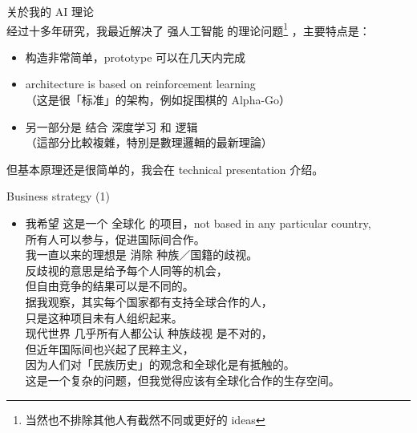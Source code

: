 \documentclass[10pt]{beamer}
\newcommand{\emp}[1]{{\color{blue}#1}}
\newcommand{\smiley}{$\vcenter{\hbox{\texttt{[image: ../smiling-face.png]}}}$}
\begin{document}



\begin{frame}
\vspace*{2em}
{\color{blue} \Large 关於我的 AI 理论}\\
\vspace*{1em}
经过十多年研究，我最近解决了 强人工智能 的理论问题\footnote{当然也不排除其他人有截然不同或更好的 ideas} ，主要特点是：
\begin{itemize}
	\item 构造非常简单，prototype 可以在几天内完成
	\item architecture is based on \emp{reinforcement learning} \\
	（这是很「标准」的架构，例如捉围棋的 Alpha-Go）
	\item 另一部分是 结合 \emp{深度学习} 和 \emp{逻辑} \\
	（這部分比較複雜，特別是數理邏輯的最新理論） 
\end{itemize}
但基本原理还是很简单的，我会在 technical presentation 介绍。 \\
\end{frame}


\begin{frame}
\vspace*{2em}
{\color{blue} \Large Business strategy (1)}
\vspace*{1em}
\begin{itemize}
	\item 我希望 这是一个 \emp{全球化} 的项目，not based in any particular country, \\
			所有人可以参与，促进国际间合作。 \\
			我一直以来的理想是 \emp{消除 种族／国籍的歧视}。 \\
			反歧视的意思是给予每个人同等的机会，\\
			但自由竞争的结果可以是不同的。 \\
			据我观察，其实每个国家都有支持全球合作的人，\\
			只是这种项目未有人组织起来。 \\
			现代世界 几乎所有人都公认 种族歧视 是不对的，\\
			但近年国际间也兴起了民粹主义，\\
			因为人们对「民族历史」的观念和全球化是有抵触的。 \\
			这是一个复杂的问题，但我觉得应该有全球化合作的生存空间。 
\end{itemize}
\end{frame}
\end{document}
